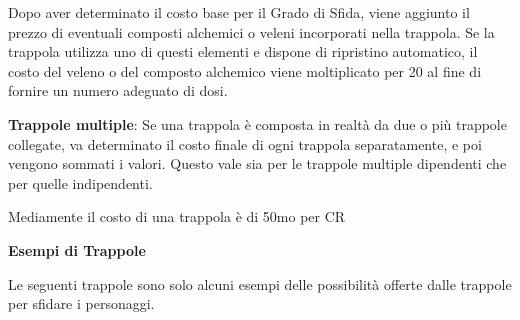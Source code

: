 \documentclass[a4paper,11pt,twoside,openany]{book}
\begin{document}
Dopo aver determinato il costo base per il Grado di Sfida, viene aggiunto il prezzo di eventuali composti alchemici o veleni incorporati nella trappola. Se la trappola utilizza uno di questi elementi e dispone di ripristino automatico, il costo del veleno o del composto alchemico viene moltiplicato per 20 al fine di fornire un numero adeguato di dosi.

\textbf{Trappole multiple}: Se una trappola è composta in realtà da due o più trappole collegate, va determinato il costo finale di ogni trappola separatamente, e poi vengono sommati i valori. Questo vale sia per le trappole multiple dipendenti che per quelle indipendenti.

Mediamente il costo di una trappola è di 50mo per CR

\pagebreak

\textbf{Esempi di Trappole}

Le seguenti trappole sono solo alcuni esempi delle possibilità offerte
dalle trappole per sfidare i personaggi.
\end{document}
